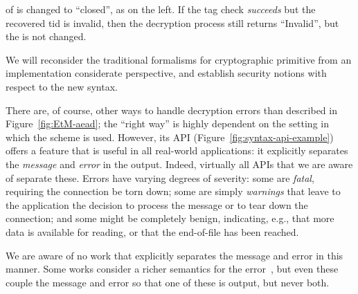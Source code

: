 of  is changed to ``closed'', as on the left.
If the tag check \emph{succeeds} but the recovered tid is invalid,
then the decryption process still returns ``Invalid'', but the
 is not changed.


\begin{task}
{We will reconsider the traditional formalisms for cryptographic primitive from an implementation considerate perspective, and establish security notions with respect to the new syntax. }
\end{task}


There are, of course, other ways to handle decryption errors than described in
Figure~\ref{fig:EtM-aead}; the ``right way'' is highly dependent on the setting
in which the scheme is used. However, its API
(Figure~\ref{fig:syntax-api-example}) offers a feature that is useful in all
real-world applications: it explicitly separates the \emph{message} and
\emph{error} in the output.
%
Indeed, virtually all APIs that we are aware of separate these.  Errors have
varying degrees of severity: some are \emph{fatal}, requiring the connection be
torn down; some are simply \emph{warnings} that leave to the application the
decision to process the message or to tear down the connection; and some might
be completely benign, indicating, e.g., that more data is available for reading,
or that the end-of-file has been reached.

We are aware of no work that explicitly separates the message and error in this
manner.
%
Some works consider a richer semantics for the error~\cite{BDPS13,FPMG15}, but
even these couple the message and error so that one of these is output, but
never both.

